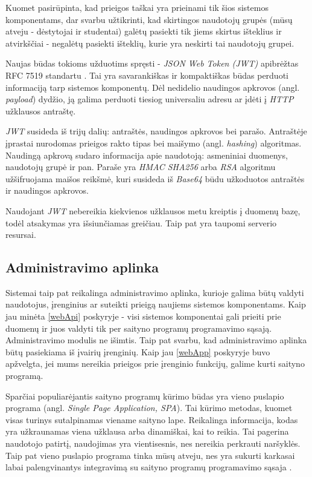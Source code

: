 \documentclass{VUMIFPSkursinis}
\begin{document}

Kuomet pasirūpinta, kad prieigos taškai yra prieinami tik šios sistemos komponentams, dar svarbu užtikrinti, kad skirtingos naudotojų grupės (mūsų atveju - dėstytojai ir studentai) galėtų pasiekti tik jiems skirtus išteklius ir atvirkščiai - negalėtų pasiekti išteklių, kurie yra neskirti tai naudotojų grupei.

Naujas būdas tokioms užduotims spręsti - \textit{JSON Web Token (JWT)}  apibrėžtas RFC 7519 standartu \cite{jwtRef}. Tai yra savarankiškas ir kompaktiškas būdas perduoti informaciją tarp sistemos komponentų. Dėl nedidelio naudingos apkrovos (angl. \textit{payload}) dydžio, ją galima perduoti tiesiog universaliu adresu ar įdėti į \textit{HTTP} užklausos antraštę.

\textit{JWT} susideda iš trijų dalių: antraštės, naudingos apkrovos bei parašo. Antraštėje įprastai nurodomas prieigos rakto tipas bei maišymo (angl. \textit{hashing}) algoritmas. Naudingą apkrovą sudaro informacija apie naudotoją: asmeniniai duomenys, naudotojų grupė ir pan. Paraše yra \textit{HMAC SHA256} arba \textit{RSA} algoritmu užšifruojama maišos reikšmė, kuri susideda iš \textit{Base64} būdu užkoduotos antraštės ir naudingos apkrovos.

Naudojant \textit{JWT} nebereikia kiekvienos užklausos metu kreiptis į duomenų bazę, todėl atsakymas yra išsiunčiamas greičiau. Taip pat yra taupomi serverio resursai. 

\subsection{Administravimo aplinka}

Sistemai taip pat reikalinga administravimo aplinka, kurioje galima būtų valdyti naudotojus, įrenginius ar suteikti prieigą naujiems sistemos komponentams. Kaip jau minėta \ref{webApi} poskyryje - visi sistemos komponentai gali prieiti prie duomenų ir juos valdyti tik per saityno programų programavimo sąsają. Administravimo modulis ne išimtis. Taip pat svarbu, kad administravimo aplinka būtų pasiekiama iš įvairių įrenginių. Kaip jau \ref{webApp} poskyryje buvo apžvelgta, jei mums nereikia prieigos prie įrenginio funkcijų, galime kurti saityno programą.

Sparčiai populiarėjantis saityno programų kūrimo būdas yra vieno puslapio programa (angl. \textit{Single Page Application, SPA}). Tai kūrimo metodas, kuomet visas turinys sutalpinamas viename saityno lape. Reikalinga informacija, kodas yra užkraunamas viena užklausa arba dinamiškai, kai to reikia. Tai pagerina naudotojo patirtį, naudojimas yra vientisesnis, nes nereikia perkrauti naršyklės. Taip pat vieno puslapio programa tinka mūsų atveju, nes yra sukurti karkasai labai palengvinantys integravimą su saityno programų programavimo sąsaja \cite{spa}.
\end{document}
